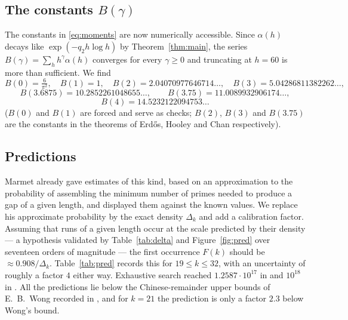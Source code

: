 \documentclass[11pt,reqno]{amsart}
\theoremstyle{plain}
\theoremstyle{definition}
\numberwithin{equation}{section}
\begin{document}
\subsection{The constants $B(\gamma)$}
The constants in \eqref{eq:moments} are now numerically accessible. Since $\alpha(h)$
decays like $\exp(-q_2h\log h)$ by Theorem~\ref{thm:main}, the series
$B(\gamma)=\sum_hh^{\gamma}\alpha(h)$ converges for every $\gamma\ge0$ and truncating at
$h=60$ is more than sufficient. We find
\[
  B(0)=\tfrac{6}{\pi^{2}},\quad B(1)=1,\quad
  B(2)=2.04070977646714\ldots,\quad B(3)=5.04286811382262\ldots,
\]
\[
  B(3.6875)=10.2852261048655\ldots,\qquad
  B(3.75)=11.0089932906174\ldots,
\]
\[
  B(4)=14.5232122094753\ldots
\]
($B(0)$ and $B(1)$ are forced and serve as checks; $B(2)$, $B(3)$ and $B(3.75)$ are the
constants in the theorems of Erd\H{o}s, Hooley and Chan respectively).

\subsection{Predictions}\label{sub:pred}
Marmet \cite[Appendix A]{Marmet} already gave estimates of this kind, based on an
approximation to the probability of assembling the minimum number of primes needed to
produce a gap of a given length, and displayed them against the known values. We replace
his approximate probability by the exact density $\Delta_k$ and add a calibration factor.
Assuming that runs of a given length occur at the scale predicted by their density --- a
hypothesis validated by Table~\ref{tab:delta} and Figure~\ref{fig:pred} over seventeen
orders of magnitude --- the first occurrence $F(k)$ should be $\approx0.908/\Delta_k$.
Table~\ref{tab:pred} records this for $19\le k\le32$, with an uncertainty of roughly a
factor $4$ either way. Exhaustive search reached $1.2587\cdot10^{17}$ in \cite{Marmet} and
$10^{18}$ in \cite{MOT}. All the predictions lie below the Chinese-remainder upper bounds
of E.~B.~Wong recorded in \cite{Marmet}, and for $k=21$ the prediction is only a factor
$2.3$ below Wong's bound.
\end{document}
